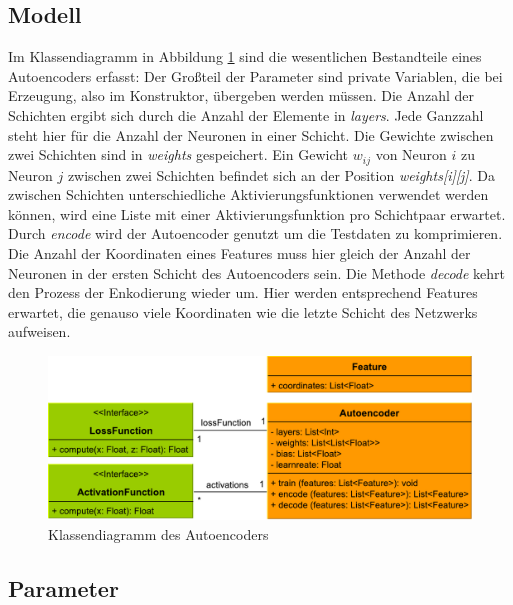 \subsection{Modell}

Im Klassendiagramm in Abbildung \ref{img:ae_class} sind die wesentlichen Bestandteile eines Autoencoders erfasst: Der Großteil der Parameter sind private Variablen, die bei Erzeugung, also im Konstruktor, übergeben werden müssen. Die Anzahl der Schichten ergibt sich durch die Anzahl der Elemente in \textit{layers}. Jede Ganzzahl steht hier für die Anzahl der Neuronen in einer Schicht. Die Gewichte zwischen zwei Schichten sind in \textit{weights} gespeichert. Ein  Gewicht $w_{ij}$ von Neuron $i$ zu Neuron $j$ zwischen zwei Schichten befindet sich an der Position \textit{weights[i][j]}. Da zwischen Schichten unterschiedliche Aktivierungsfunktionen verwendet werden können, wird eine Liste  mit einer Aktivierungsfunktion pro Schichtpaar erwartet. \newline
Durch \textit{encode} wird der Autoencoder genutzt um die Testdaten zu komprimieren. Die Anzahl der Koordinaten eines Features muss hier gleich der Anzahl der Neuronen in der ersten Schicht des Autoencoders sein. Die Methode \textit{decode} kehrt den Prozess der Enkodierung wieder um. Hier werden entsprechend Features erwartet, die genauso viele Koordinaten wie die letzte Schicht des Netzwerks aufweisen.
  
\begin{figure}
	\centering
	\includegraphics[scale=0.6]{images/ae_class.pdf}
	\caption{Klassendiagramm des Autoencoders}
	\label{img:ae_class}
\end{figure}

\subsection{Parameter}

